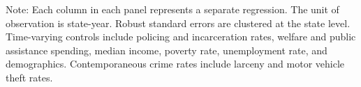 \begin{sidewaystable}[htbp]
\begin{threeparttable}
        \begin{tablenotes}
            \footnotesize
            \item Note: Each column in each panel represents a separate regression. 
            The unit of observation is state-year. 
            Robust standard errors are clustered at the state level. 
            Time-varying controls include policing and incarceration rates, welfare and public assistance spending, 
            median income, poverty rate, unemployment rate, and demographics. 
            Contemporaneous crime rates include larceny and motor vehicle theft rates.
        \end{tablenotes}
    \end{threeparttable}
\end{sidewaystable}
